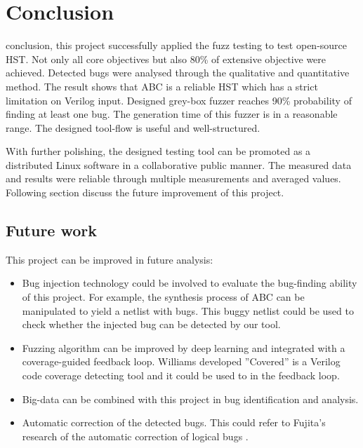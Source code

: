 \chapter{Conclusion}
\renewcommand{\baselinestretch}{\mystretch}
\label{chap:Con}
 conclusion, this project successfully applied the fuzz testing to test open-source HST. Not only all core objectives but also 80\% of extensive objective were achieved. Detected bugs were analysed through the qualitative and quantitative method. The result shows that ABC is a reliable HST which has a strict limitation on Verilog input. Designed grey-box fuzzer reaches 90\% probability of finding at least one bug. The generation time of this fuzzer is in a reasonable range. The designed tool-flow is useful and well-structured.

With further polishing, the designed testing tool can be promoted as a distributed Linux software in a collaborative public manner. The measured data and results were reliable through multiple measurements and averaged values. Following section discuss the future improvement of this project.


\section{Future work}
This project can be improved in future analysis: 
\begin{itemize}
\item Bug injection technology \cite{calagar2014source} could be involved to evaluate the bug-finding ability of this project. For example, the synthesis process of ABC can be manipulated to yield a netlist with bugs. This buggy netlist could be used to check whether the injected bug can be detected by our tool. 
    \item Fuzzing algorithm can be improved by deep learning and integrated with a coverage-guided feedback loop. Williams developed ''Covered'' is a Verilog code coverage detecting tool and it could be used to in the feedback loop.   
    \item Big-data can be combined with this project in bug identification and analysis.
    \item Automatic correction of the detected bugs. This could refer to Fujita's research of the automatic correction of logical bugs \cite{fujita2018automatic}.
\end{itemize} 
